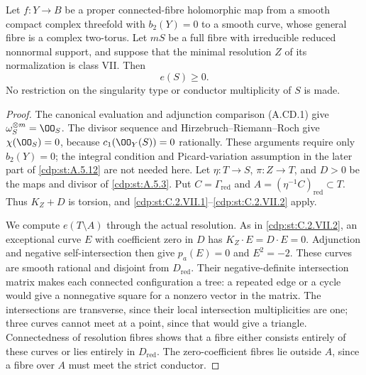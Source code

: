 
\begin{proposition}\label{cdp:st:C.2.VII.3}

Let $f:Y\to B$ be a proper connected-fibre holomorphic
map from a smooth compact complex threefold with
$b_2(Y)=0$ to a smooth curve, whose general fibre is a
complex two-torus. Let $mS$ be a full fibre with
irreducible reduced nonnormal support, and suppose
that the minimal resolution $Z$ of its normalization
is class VII. Then
\[
 e(S)\ge0.
\tag{C.VII.7}\label{cdp:eq:C.VII.7}
\]
No restriction on the singularity type or conductor
multiplicity of $S$ is made.
\end{proposition}
\begin{proof}
The canonical evaluation and adjunction comparison
(A.CD.1) give $\omega_S^{\otimes m}=\OO_S$.
The divisor sequence and Hirzebruch--Riemann--Roch
give $\chi(\OO_S)=0$, because $c_1(\OO_Y(S))=0$
rationally. These arguments require only $b_2(Y)=0$;
the integral condition and Picard-variation assumption
in the later part of \ref{cdp:st:A.5.12} are not needed here.
Let $\eta:T\to S$, $\pi:Z\to T$, and
$D>0$ be the maps and divisor of \ref{cdp:st:A.5.3}. Put
$C=\Gamma_{\mathrm{red}}$ and
$A=(\eta^{-1}C)_{\mathrm{red}}\subset T$.
Thus $K_Z+D$ is torsion, and \ref{cdp:st:C.2.VII.1}--\ref{cdp:st:C.2.VII.2}
apply.

We compute $e(T\setminus A)$ through the actual
resolution. As in \ref{cdp:st:C.2.VII.2}, an exceptional curve
$E$ with coefficient zero in $D$ has
$K_Z\cdot E=D\cdot E=0$.
Adjunction and negative self-intersection then give
$p_a(E)=0$ and $E^2=-2$.
These curves are smooth rational and disjoint
from $D_{\mathrm{red}}$.
Their negative-definite intersection matrix makes
each connected configuration a tree: a repeated
edge or a cycle would give a nonnegative square
for a nonzero vector in the matrix. The intersections
are transverse, since their local intersection
multiplicities are one; three curves cannot meet
at a point, since that would give a triangle.
Connectedness of resolution fibres shows that a
fibre either consists entirely of these curves or
lies entirely in $D_{\mathrm{red}}$.
The zero-coefficient fibres lie outside $A$, since
a fibre over $A$ must meet the strict conductor.


\end{proof}
